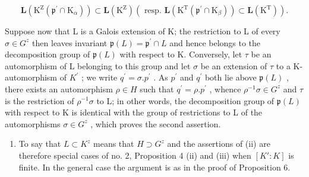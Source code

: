 \[
\mathbf {L} \left(\mathrm{K} ^ {\mathrm{Z}} \left(\mathfrak {p} ^ {\prime} \cap \mathrm{K} _ {\alpha}\right)\right) \subset \mathbf {L} \left(\mathrm{K} ^ {\mathrm{Z}}\right) (\text { resp. } \mathbf {L} \left(\mathrm{K} ^ {\mathrm{T}} \left(\mathfrak {p} ^ {\prime} \cap \mathrm{K} _ {\beta}\right)\right) \subset \mathbf {L} \left(\mathrm{K} ^ {\mathrm{T}}\right)).
\]

Suppose now that L is a Galois extension of K; the restriction to L of every \(\sigma\in G^{z}\) then leaves invariant \(\mathfrak{p}(L)=\mathfrak{p}^{\prime}\cap L\) and hence belongs to the decomposition group of \(\mathfrak{p}(L)\) with respect to K. Conversely, let \(\tau\) be an automorphism of L belonging to this group and let \(\sigma\) be an extension of \(\tau\) to a K-automorphism of \(K^{\prime}\) ; we write \(q^{\prime}=\sigma.p^{\prime}\) . As \(p^{\prime}\) and \(q^{\prime}\) both lie above \(\mathfrak{p}(L)\) , there exists an automorphism \(\rho\in H\) such that \(q^{\prime}=\rho.p^{\prime}\) , whence \(\rho^{-1}\sigma\in G^{z}\) and \(\tau\) is the restriction of \(\rho^{-1}\sigma\) to L; in other words, the decomposition group of \(\mathfrak{p}(L)\) with respect to K is identical with the group of restrictions to L of the automorphisms \(\sigma\in G^{z}\) , which proves the second assertion.

\begin{enumerate}
\def\labelenumi{(\roman{enumi})}
\setcounter{enumi}{1}
\tightlist
\item
  To say that \(L \subset K^{z}\) means that \(H \supset G^{z}\) and the assertions of (ii) are therefore special cases of no. 2, Proposition 4 (ii) and (iii) when \([K':K]\) is finite. In the general case the argument is as in the proof of Proposition 6.
\end{enumerate}

